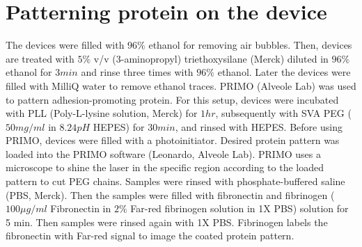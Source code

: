 \section{Patterning protein on the device}
The devices were filled with $96\%$ ethanol for removing air bubbles. Then, devices are treated with $5\%$ v/v (3-aminopropyl) triethoxysilane (Merck) diluted in $96\%$ ethanol for $3 min$ and rinse three times with $96\%$ ethanol. Later the devices were filled with MilliQ water to remove ethanol traces. PRIMO (Alveole Lab) was used to pattern adhesion-promoting protein. For this setup, devices were incubated with PLL (Poly-L-lysine solution, Merck) for $1 hr$, subsequently with SVA PEG ($50mg/ml$ in $8.24 pH$ HEPES) for $30 min$, and rinsed with HEPES. Before using PRIMO, devices were filled with a photoinitiator. Desired protein pattern was loaded into the PRIMO software (Leonardo, Alveole Lab). PRIMO uses a microscope to shine the laser in the specific region according to the loaded pattern to cut PEG chains. Samples were rinsed with phosphate-buffered saline (PBS, Merck). Then the samples were filled with fibronectin and fibrinogen ($100 \mu g/ml$ Fibronectin in $2\%$ Far-red fibrinogen solution in 1X PBS) solution for 5 min. Then samples were rinsed again with 1X PBS. Fibrinogen labels the fibronectin with Far-red signal to image the coated protein pattern.
